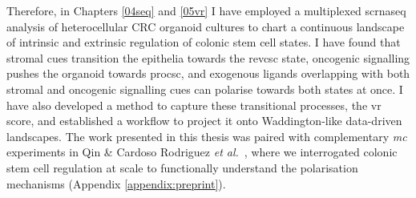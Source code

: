 Therefore, in Chapters \ref{04seq} and \ref{05vr} I have employed a multiplexed \acrshort{scrnaseq} analysis of heterocellular CRC organoid cultures to chart a continuous landscape of intrinsic and extrinsic regulation of colonic stem cell states. I have found that stromal cues transition the epithelia towards the \acrshort{revcsc} state, oncogenic signalling pushes the organoid towards \acrshort{procsc}, and exogenous ligands overlapping with both stromal and oncogenic signalling cues can polarise towards both states at once. I have also developed a method to capture these transitional processes, the \acrfull{vr} score, and established a workflow to project it onto Waddington-like data-driven landscapes. 
The work presented in this thesis was paired with complementary \emph{mc} experiments in Qin \& Cardoso Rodriguez \emph{et al.}~\cite{cardoso_rodriguez_single-cell_2023}, where we interrogated colonic stem cell regulation at scale to functionally understand the polarisation mechanisms (Appendix \ref{appendix:preprint}).

